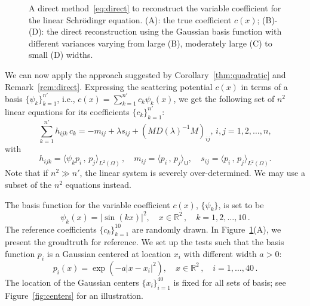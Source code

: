 \documentclass[12pt]{amsart}
\begin{document}
\begin{figure}
    \caption{A direct method~\eqref{eq:direct} to reconstruct the variable coefficient for the linear Schr\"odingr equation. (A): the true coefficient $c(x)$; (B)-(D): the direct reconstruction using the Gaussian basis function with different variances varying from large (B), moderately large (C) to small (D) widths.}
    \label{fig:direct_method}
\end{figure}


We can now apply the approach suggested by Corollary~\ref{thm:quadratic} and Remark~\ref{rem:direct}. Expressing the scattering potential $c(x)$ in terms of a basis $\{\psi_k\}_{k=1}^{n'}$, i.e., $c(x) = \sum_{k=1}^{n'} c_k \psi_k(x)$, we get the following set of $n^2$ linear equations for its coefficients $\{c_k\}_{k=1}^{n'}$:
\begin{equation}\label{eq:direct}
\sum_{k=1}^{n'} h_{ijk} \, c_k = -m_{ij} + \lambda s_{ij} + \left(MD(\lambda)^{-1}M\right)_{ij}, \, i,j = 1, 2, \ldots, n,
\end{equation}
with
\[
h_{ijk} = \langle \psi_k p_i\,, \,p_j\rangle_{L^2(\Omega)}\,, \quad m_{ij} = \langle p_i\,, \,p_j\rangle_{\mathsf{U}}, \quad s_{ij} = \langle p_i\,, \, p_j\rangle_{L^2(\Omega)}.
\]
Note that if $n^2 \gg n'$, the linear system is severely over-determined. We may use a subset of the $n^2$ equations instead.

The basis function for the variable coefficient $c(x)$, $\{\psi_k\}$, is set to be
\[
\psi_k(x) = |\sin ( k x )|^2, \quad x\in \mathbb{R}^2\,,\quad k = 1,2,\ldots, 10\,.
\]
The reference coefficients $\{c_k\}_{k=1}^{10}$ are randomly drawn. In Figure~\ref{fig:direct_method}(A), we present the groudtruth for reference. We set up the tests such that the basis function $p_i$ is a Gaussian centered at location $x_i$ with different width $a>0$:
\[
p_i(x) = \exp{(-a|x-x_i|^2)},\quad x\in \mathbb{R}^2\,,\quad i = 1,\ldots,40\,.
\]
The location of the Gaussian centers $\{x_i\}_{i=1}^{40}$ is fixed for all sets of basis; see Figure~\ref{fig:centers} for an illustration.
\end{document}
